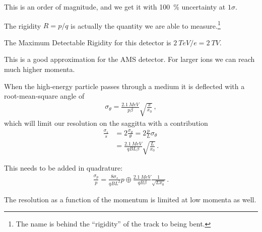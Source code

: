 \documentclass[main.tex]{subfiles}
\begin{document}
This is an order of magnitude, and we get it with \SI{100}{\percent} uncertainty at \(1 \sigma \). 

The rigidity \(R = p / q\) is actually the quantity we are able to measure.\footnote{The name is behind the ``rigidity'' of the track to being bent.}

The Maximum Detectable Rigidity for this detector is \(\SI{2}{TeV/e} = \SI{2}{TV}\). 

This is a good approximation for the AMS detector. 
For larger ions we can reach much higher momenta. 

When the high-energy particle passes through a medium it is deflected with a root-mean-square angle of 
%
\begin{align}
\sigma _\theta = \frac{\SI{2.1}{MeV}}{p \beta } \sqrt{\frac{x}{x_0 }}
\,,
\end{align}
%
which will limit our resolution on the saggitta with a contribution 
%
\begin{align}
\frac{\sigma _s}{s} &= 2 \frac{\sigma _\theta }{\theta } = 2 \frac{p}{L} \sigma _\theta  \\
&= \frac{\SI{2.1}{MeV}}{qBL \beta } \sqrt{ \frac{L}{x_0 }}
\,.
\end{align}

This needs to be added in quadrature: 
%
\begin{align}
\frac{\sigma _p}{p} = \frac{8 \sigma _s}{qBL^2} p \oplus \frac{\SI{2.1}{MeV}}{qB \beta } \frac{1}{\sqrt{L x_0 }}
\,.
\end{align}

The resolution as a function of the momentum is limited at low momenta as well. 
\end{document}
